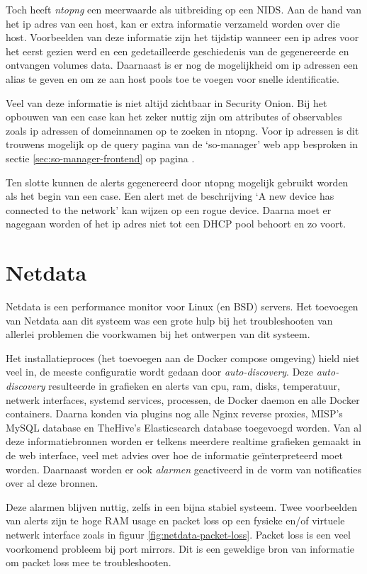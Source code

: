 \documentclass[a4paper,12pt]{report}
\begin{document}
Toch heeft \emph{ntopng} een meerwaarde als uitbreiding op een NIDS.
Aan de hand van het ip adres van een host, kan er extra informatie verzameld worden over die host.
Voorbeelden van deze informatie zijn het tijdstip wanneer een ip adres voor het eerst gezien werd en een gedetailleerde geschiedenis van de gegenereerde en ontvangen volumes data.
Daarnaast is er nog de mogelijkheid om ip adressen een alias te geven en om ze aan host pools toe te voegen voor snelle identificatie.

Veel van deze informatie is niet altijd zichtbaar in Security Onion.
Bij het opbouwen van een case kan het zeker nuttig zijn om attributes of observables zoals ip adressen of domeinnamen op te zoeken in ntopng.
Voor ip adressen is dit trouwens mogelijk op de query pagina van de `so-manager' web app besproken in sectie \ref{sec:so-manager-frontend} op pagina \pageref{sec:so-manager-frontend}.

Ten slotte kunnen de alerts gegenereerd door ntopng mogelijk gebruikt worden als het begin van een case.
Een alert met de beschrijving `A new device has connected to the network' kan wijzen op een rogue device.
Daarna moet er nagegaan worden of het ip adres niet tot een DHCP pool behoort en zo voort.

\section{Netdata}
Netdata is een performance monitor voor Linux (en BSD) servers. \autocite{netdata:home}
Het toevoegen van Netdata aan dit systeem was een grote hulp bij het troubleshooten van allerlei problemen die voorkwamen bij het ontwerpen van dit systeem.

Het installatieproces (het toevoegen aan de Docker compose omgeving) hield niet veel in, de meeste configuratie wordt gedaan door \emph{auto-discovery}.
Deze \emph{auto-discovery} resulteerde in grafieken en alerts van cpu, ram, disks, temperatuur, netwerk interfaces, systemd services, processen, de Docker daemon en alle Docker containers.
Daarna konden via plugins nog alle Nginx reverse proxies, MISP's MySQL database en TheHive's Elasticsearch database toegevoegd worden.
Van al deze informatiebronnen worden er telkens meerdere realtime grafieken gemaakt in de web interface, veel met advies over hoe de informatie geïnterpreteerd moet worden.
Daarnaast worden er ook \emph{alarmen} geactiveerd in de vorm van notificaties over al deze bronnen.

Deze alarmen blijven nuttig, zelfs in een bijna stabiel systeem.
Twee voorbeelden van alerts zijn te hoge RAM usage en packet loss op een fysieke en/of virtuele netwerk interface zoals in figuur \ref{fig:netdata-packet-loss}.
Packet loss is een veel voorkomend probleem bij port mirrors.
Dit is een geweldige bron van informatie om packet loss mee te troubleshooten.
\end{document}
